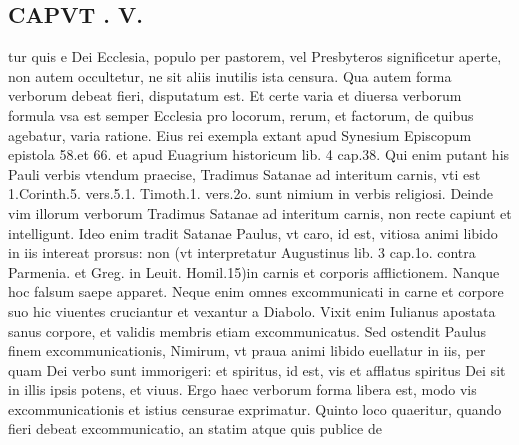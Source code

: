 \documentclass{article}
\begin{document}
\begin{pages}
\section*{CAPVT . V. }
\marginpar{[ p.397 ]}\pstart tur quis e Dei Ecclesia, populo per pastorem, vel Presbyteros significetur aperte, non autem occultetur, ne sit aliis inutilis ista censura. Qua autem forma verborum debeat fieri, disputatum est. Et certe varia et diuersa verborum formula vsa est semper Ecclesia pro locorum, rerum, et factorum, de quibus agebatur, varia ratione. Eius rei exempla extant apud Synesium Episcopum epistola 58.et 66. et apud Euagrium historicum lib. 4 cap.38. Qui enim putant his Pauli verbis vtendum praecise, Tradimus Satanae ad interitum carnis, vti est 1.Corinth.5. vers.5.1. Timoth.1. vers.2o. sunt nimium in verbis religiosi. Deinde vim illorum verborum Tradimus Satanae ad interitum carnis, non recte capiunt et intelligunt. Ideo enim tradit Satanae Paulus, vt caro, id est, vitiosa animi libido in iis intereat prorsus: non (vt interpretatur Augustinus lib. 3 cap.1o. contra Parmenia. et Greg. in Leuit. Homil.15)in carnis et corporis afflictionem. Nanque hoc falsum saepe apparet. Neque enim omnes excommunicati in carne et corpore suo hic viuentes cruciantur et vexantur a Diabolo. Vixit enim Iulianus apostata sanus corpore, et validis membris etiam excommunicatus. Sed ostendit Paulus finem excommunicationis, Nimirum, vt praua animi libido euellatur in iis, per quam Dei verbo sunt immorigeri: et spiritus, id est, vis et afflatus spiritus Dei sit in illis ipsis potens, et viuus. Ergo haec verborum forma libera est, modo vis excommunicationis et istius censurae exprimatur. Quinto loco quaeritur, quando fieri debeat excommunicatio, an statim atque quis publice de  \pend

\end{pages}
\end{document}
